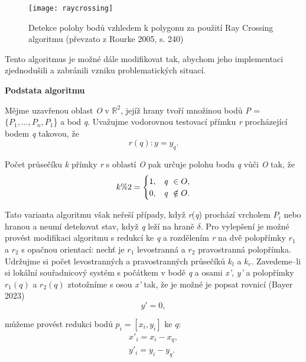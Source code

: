 \begin{figure}[h]
\centering
\texttt{[image: raycrossing]} %
    \caption{Detekce polohy bodů vzhledem k polygonu za použití Ray Crossing algoritmu (převzato z Rourke 2005, s. 240)}
\end{figure}

\par Tento algoritmus je možné dále modifikovat tak, abychom jeho implementaci zjednodušili a zabránili vzniku problematických situací.

\bigbreak

\par {\large\textbf{Podstata algoritmu} }
\par Mějme uzavřenou oblast \emph{O} v $\mathbb{R}^2$, jejíž hrany tvoří množinou bodů \emph{P} = {$\{P_1, ..., P_n, P_1$\} a bod {\emph{q}}}. Uvažujme vodorovnou testovací přímku \emph{r} procházející bodem \emph{q} takovou, že 
\begin{equation} r(q): y=y_q.\end{equation}

\par Počet průsečíku \emph{k} přímky \emph{r} s oblastí \emph{O} pak určuje polohu bodu \emph{q} vůči \emph{O} tak, že
\begin{equation} k\%2=\begin{cases} 1, & \text{\emph{q}}\ \in O, \\ 0 , & \text{\emph{q}} \ \notin O. \\\end{cases}\end{equation}

\par Tato varianta algoritmu však neřeší případy, když \emph{r}(\emph{q}) prochází vrcholem $P_i$ nebo hranou a neumí detekovat stav, když \emph{q} leží na hraně $\delta$. Pro vylepšení je možné provést modifikaci algoritmu s redukcí ke \emph{q} a rozdělením \emph{r} na dvě polopřímky $r_1$ a $r_2$ s opačnou orientací: nechť je $r_1$ levostranná a $r_2$ pravostranná polopřímka. Udržujme si počet levostranných a pravostranných průsečíků $k_l$ a $k_r$. Zavedeme–li si lokální souřadnicový systém s počátkem v bodě \emph{q} a osami \emph{x'}, \emph{y'} a polopřímky  $r_1(q)$ a $r_2(q)$ ztotožníme s osou \emph{x'} tak, že je možné je popsat rovnicí (Bayer 2023)
\begin{equation} y' = 0,\end{equation}

\par můžeme provést redukci bodů $p_i = [x_i, y_i]$ ke $q$:
\begin{equation}\begin{aligned}x'_i = x_i - x_q, \\
                               y'_i = y_i - y_q.
 \end{aligned}\end{equation}
 
